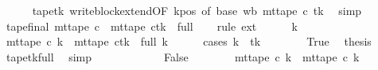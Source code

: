 \begin{isabellebody}
\ \ \ \ \isamarkupfalse%
\ tape{}{\isacharunderscore}{\kern0pt}tk\ write{\isacharunderscore}{\kern0pt}block{\isacharunderscore}{\kern0pt}extend{\isacharbrackleft}{\kern0pt}OF\ kpos{\isacharcomma}{\kern0pt}\ of\ base\ {\isacharquery}{\kern0pt}wb\ {\isachardoublequoteopen}mt{\isacharunderscore}{\kern0pt}tape\ c{\isacharprime}{\kern0pt}\ tk{\isachardoublequoteclose}{\isacharbrackright}{\kern0pt}\ \isamarkupfalse%
\ simp\isanewline
\ \ \isamarkupfalse%
\ tape{\isacharunderscore}{\kern0pt}final{\isacharcolon}{\kern0pt}\ {\isachardoublequoteopen}mt{\isacharunderscore}{\kern0pt}tape\ c{}\ {\isacharequal}{\kern0pt}\ {\isacharparenleft}{\kern0pt}mt{\isacharunderscore}{\kern0pt}tape\ c{\isacharprime}{\kern0pt}{\isacharparenright}{\kern0pt}{\isacharparenleft}{\kern0pt}tk\ {\isacharcolon}{\kern0pt}{\isacharequal}{\kern0pt}\ {\isacharquery}{\kern0pt}full{\isacharparenright}{\kern0pt}{\isachardoublequoteclose}\isanewline
\ \ \isamarkupfalse%
\ {\isacharparenleft}{\kern0pt}rule\ ext{\isacharparenright}{\kern0pt}\isanewline
\ \ \ \ \isamarkupfalse%
\ k{\isacharprime}{\kern0pt}\isanewline
\ \ \ \ \isamarkupfalse%
\ {\isachardoublequoteopen}mt{\isacharunderscore}{\kern0pt}tape\ c{}\ k{\isacharprime}{\kern0pt}\ {\isacharequal}{\kern0pt}\ {\isacharparenleft}{\kern0pt}{\isacharparenleft}{\kern0pt}mt{\isacharunderscore}{\kern0pt}tape\ c{\isacharprime}{\kern0pt}{\isacharparenright}{\kern0pt}{\isacharparenleft}{\kern0pt}tk\ {\isacharcolon}{\kern0pt}{\isacharequal}{\kern0pt}\ {\isacharquery}{\kern0pt}full{\isacharparenright}{\kern0pt}{\isacharparenright}{\kern0pt}\ k{\isacharprime}{\kern0pt}{\isachardoublequoteclose}\isanewline
\ \ \ \ \isamarkupfalse%
\ {\isacharparenleft}{\kern0pt}cases\ {\isachardoublequoteopen}k{\isacharprime}{\kern0pt}\ {\isacharequal}{\kern0pt}\ tk{\isachardoublequoteclose}{\isacharparenright}{\kern0pt}\isanewline
\ \ \ \ \ \ \isamarkupfalse%
\ True\ \isamarkupfalse%
\ {\isacharquery}{\kern0pt}thesis\ \isamarkupfalse%
\ tape{}{\isacharunderscore}{\kern0pt}tk{\isacharunderscore}{\kern0pt}full\ \isamarkupfalse%
\ simp\isanewline
\ \ \ \ \isamarkupfalse%
\isanewline
\ \ \ \ \ \ \isamarkupfalse%
\ False\isanewline
\ \ \ \ \ \ \isamarkupfalse%
\ {\isachardoublequoteopen}mt{\isacharunderscore}{\kern0pt}tape\ c{}\ k{\isacharprime}{\kern0pt}\ {\isacharequal}{\kern0pt}\ mt{\isacharunderscore}{\kern0pt}tape\ c{}\ k{\isacharprime}{\kern0pt}{\isachardoublequoteclose}\ \isamarkupfalse%

\end{isabellebody}
